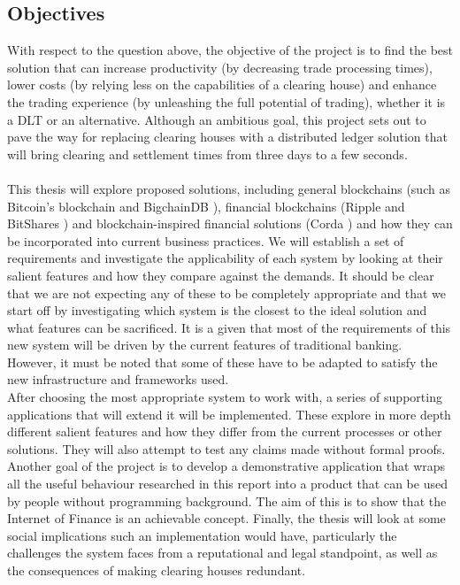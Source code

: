 \documentclass[12pt,twoside]{article}
\begin{document}
\subsection{Objectives}
\label{sec:Objectives}
With respect to the question above, the objective of the project is to find the best solution that can increase productivity (by decreasing trade processing times), lower costs (by relying less on the capabilities of a clearing house) and enhance the trading experience (by unleashing the full potential of trading), whether it is a DLT or an alternative. Although an ambitious goal, this project sets out to pave the way for replacing clearing houses with a distributed ledger solution that will bring clearing and settlement times from three days to a few seconds. 
\\ \\
This thesis will explore proposed solutions, including general blockchains (such as Bitcoin's blockchain \cite{SNakamoto:Bitcoin} and BigchainDB \cite{DBC}), financial blockchains (Ripple \cite{Ripple:docs} and BitShares \cite{BS:tech}) and blockchain-inspired financial solutions (Corda \cite{Corda:code}) and how they can be incorporated into current business practices. We will establish a set of requirements and investigate the applicability of each system by looking at their salient features and how they compare against the demands. It should be clear that we are not expecting any of these to be completely appropriate and that we start off by investigating which system is the closest to the ideal solution and what features can be sacrificed. It is a given that most of the requirements of this new system will be driven by the current features of traditional banking. However, it must be noted that some of these have to be adapted to satisfy the new infrastructure and frameworks used.
\\
After choosing the most appropriate system to work with, a series of supporting applications that will extend it will be implemented. These explore in more depth different salient features and how they differ from the current processes or other solutions. They will also attempt to test any claims made without formal proofs. Another goal of the project is to develop a demonstrative application that wraps all the useful behaviour researched in this report into a product that can be used by people without programming background. The aim of this is to show that the Internet of Finance \cite{CMM:RN} is an achievable concept. Finally, the thesis will look at some social implications such an implementation would have, particularly the challenges the system faces from a reputational and legal standpoint, as well as the consequences of making clearing houses redundant.
\end{document}
